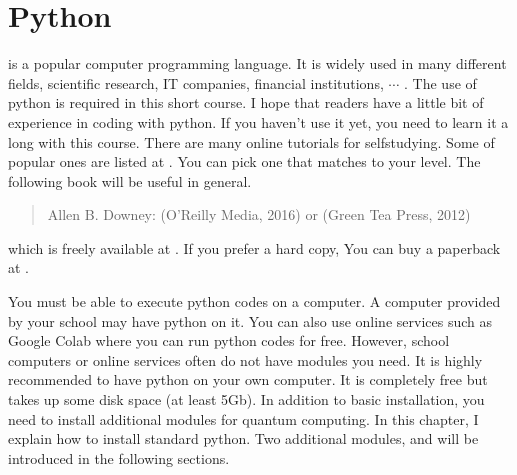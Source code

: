 \documentclass[letterpaper,10pt,english]{jupyterBook}
\begin{document}
\sphinxstepscope


\section{Python}
\label{\detokenize{preparation/python:python}}\label{\detokenize{preparation/python:sec-python}}\label{\detokenize{preparation/python::doc}}
\sphinxAtStartPar
{} is a popular computer programming language. It is widely used in many different fields, scientific research, IT companies, financial institutions, \(\cdots\) .  The use of python is required in this short course. I hope that readers have a little bit of experience in coding with python. If you haven’t use it yet, you need to learn it a long with this course.  There are many online tutorials for self\sphinxhyphen{}studying.  Some of popular ones are listed at
.  You can pick one that matches to your level.  The following book will be useful in general.
\begin{quote}

\sphinxAtStartPar
Allen B. Downey:  (O’Reilly Media, 2016) or (Green Tea Press, 2012)
\end{quote}

\sphinxAtStartPar
which is freely available at .  If you prefer a hard copy, You can buy a paperback at .

\sphinxAtStartPar
You must be able to execute python codes on a computer.  A computer provided by your school may have python on it.  You can also use online services such as Google Colab where you can run python codes for free.   However, school computers or online services often do not have modules you need.   It is highly recommended to have python on your own computer.  It is completely free but takes up some disk space (at least 5Gb).  In addition to basic installation, you need to install additional modules for quantum computing.  In this chapter, I explain how to install standard python.  Two additional modules,  and  will be introduced in the following sections.
\end{document}
